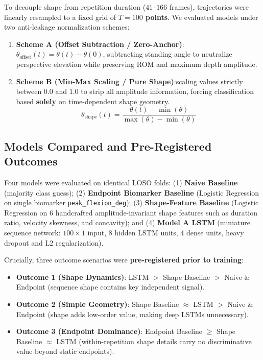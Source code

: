 To decouple shape from repetition duration ($41\text{--}166$ frames), trajectories were linearly resampled to a fixed grid of \textbf{$T = 100$ points}. We evaluated models under two anti-leakage normalization schemes:
\begin{enumerate}
  \item \textbf{Scheme A (Offset Subtraction / Zero-Anchor)}: $\theta_{\text{offset}}(t) = \theta(t) - \theta(0)$, subtracting standing angle to neutralize perspective elevation while preserving ROM and maximum depth amplitude.
  \item \textbf{Scheme B (Min-Max Scaling / Pure Shape)}:scaling values strictly between $0.0$ and $1.0$ to strip all amplitude information, forcing classification based \textbf{solely} on time-dependent shape geometry.
\begin{equation}
  \theta_{\text{shape}}(t) = \frac{\theta(t) - \min(\theta)}{\max(\theta) - \min(\theta)}
  \label{eq:auto1}
\end{equation}
\end{enumerate}

\subsection{Models Compared and Pre-Registered Outcomes}
\label{sec:13-2-3-models-compared-and-pre-registered-outcomes}

Four models were evaluated on identical LOSO folds: (1) \textbf{Naive Baseline} (majority class guess); (2) \textbf{Endpoint Biomarker Baseline} (Logistic Regression on single biomarker \texttt{peak\_flexion\_deg}); (3) \textbf{Shape-Feature Baseline} (Logistic Regression on 6 handcrafted amplitude-invariant shape features such as duration ratio, velocity skewness, and concavity); and (4) \textbf{Model A LSTM} (miniature sequence network: $100 \times 1$ input, 8 hidden LSTM units, 4 dense units, heavy dropout and L2 regularization).

Crucially, three outcome scenarios were \textbf{pre-registered prior to training}:
\begin{itemize}
  \item \textbf{Outcome 1 (Shape Dynamics)}: LSTM $>$ Shape Baseline $>$ Naive \& Endpoint (sequence shape contains key independent signal).
  \item \textbf{Outcome 2 (Simple Geometry)}: Shape Baseline $\approx$ LSTM $>$ Naive \& Endpoint (shape adds low-order value, making deep LSTMs unnecessary).
  \item \textbf{Outcome 3 (Endpoint Dominance)}: Endpoint Baseline $\ge$ Shape Baseline $\approx$ LSTM (within-repetition shape details carry no discriminative value beyond static endpoints).
\end{itemize}




